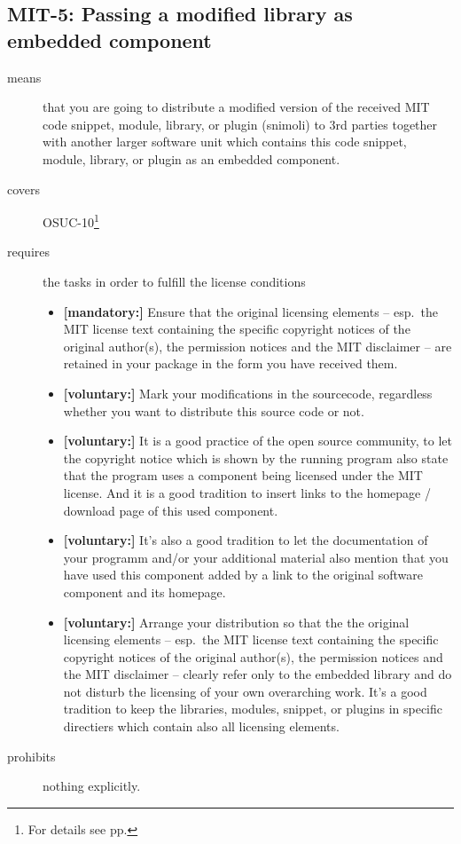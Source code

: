 \subsection{MIT-5: Passing a modified library as embedded component}
\label{OSUC-10-MIT}
\begin{description}
\item[means] that you are going to distribute a modified version of the received
MIT code snippet, module, library, or plugin (snimoli) to 3rd parties together
with another larger software unit which contains this code snippet, module,
library, or plugin as an embedded component.
\item[covers] OSUC-10\footnote{For details see pp. \pageref{OSUC-10-DEF}}
\item[requires] the tasks in order to fulfill the license conditions
\begin{itemize}
  \item \textbf{[mandatory:]} Ensure that the original licensing elements -- esp.\
  the MIT license text containing the specific copyright notices of the original
  author(s), the permission notices and the MIT disclaimer -- are retained in
  your package in the form you have received them.
  \item \textbf{[voluntary:]} Mark your modifications in the sourcecode,
  regardless whether you want to distribute this source code or not.
  
  \item \textbf{[voluntary:]} It is a good practice of the open source
  community, to let the copyright notice which is shown by the running program
  also state that the program uses a component being licensed under the MIT
  license. And it is a good tradition to insert links to the homepage / download
  page of this used component.

  \item \textbf{[voluntary:]} It's also a good tradition to let the
  documentation of your programm and/or your additional material also mention
  that you have used this component added by a link to the original software
  component and its homepage.
  
  \item \textbf{[voluntary:]} Arrange your distribution so that the the original
  licensing elements -- esp.\ the MIT license text containing the specific
  copyright notices of the original author(s), the permission notices and the
  MIT disclaimer --  clearly refer only to the embedded library and do not
  disturb the licensing of your own overarching work. It's a good tradition to
  keep the libraries, modules, snippet, or plugins in specific directiers which
  contain also all licensing elements.
  
\end{itemize}
\item[prohibits] nothing explicitly.
\end{description}

